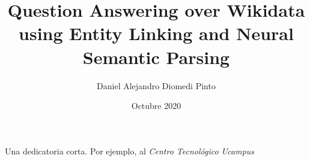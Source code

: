 \documentclass[upright, contnum]{umemoria}
\author{Daniel Alejandro Diomedi Pinto}
\title{Question Answering over Wikidata using Entity Linking and Neural Semantic Parsing}
\date{Octubre 2020}
\begin{document}
\frontmatter
\maketitle

\begin{resumen}
    {\lipsum[1-4]}
\end{resumen}

\begin{abstract}
    {\lipsum[1-4]}
\end{abstract}

\begin{dedicatoria} %
Una dedicatoria corta. Por ejemplo, al \emph{Centro Tecnológico Ucampus}
\end{dedicatoria}

\begin{thanks} %
\lipsum[1-2]
\end{thanks}
\cleardoublepage

\tableofcontents
\listoftables %
\listoffigures %

\mainmatter


%
%





\end{document}
